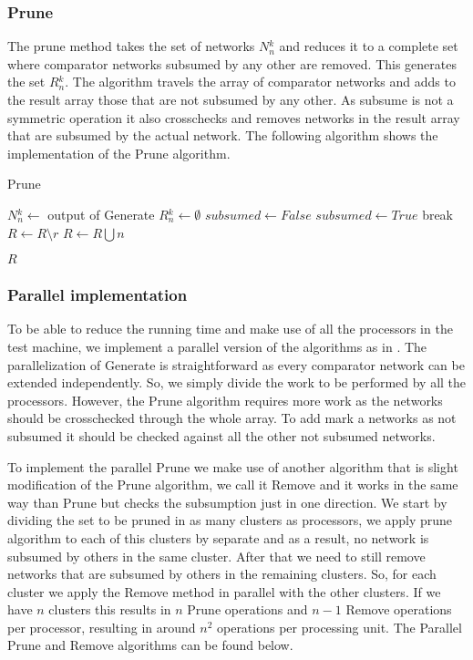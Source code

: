\documentclass[../main.tex]{subfiles}
\begin{document}
	\subsubsection{Prune}
	The prune method takes the set of networks $N{_n^{k}}$ and reduces it to a complete set where comparator networks subsumed by any other are removed. This generates the set $R{_n^k}$. The algorithm travels the array of comparator networks and adds to the result array those that are not subsumed by any other. As subsume is not a symmetric operation it also crosschecks and removes networks in the result array that are subsumed by the actual network. The following algorithm shows the implementation of the Prune algorithm. 
	\begin{algorithm}[H]
		\caption{Prune} 
		\begin{algorithmic}
			\State $N{_n^k} \leftarrow$ output of Generate
			\State $R{_n^k} \leftarrow \emptyset$
			\State $subsumed \leftarrow False$
			\State $subsumed \leftarrow True$
			\State break
			\EndIf
			\State $R \leftarrow R \setminus r$
			\EndIf
			\EndFor
			\State $R \leftarrow R \bigcup n$
			\EndIf
			\EndFor
			
			\Return $R$
		\end{algorithmic}
	\end{algorithm}
	
	\subsubsection{Parallel implementation}
	To be able to reduce the running time and make use of all the processors in the test machine, we implement a parallel version of the algorithms as in \cite{sortingnineinputs}. The parallelization of Generate is straightforward as every comparator network can be extended independently. So, we simply divide the work to be performed by all the processors.
	However, the Prune algorithm requires more work as the networks should be crosschecked through the whole array. To add mark a networks as not subsumed it should be checked against all the other not subsumed networks.
	
	To implement the parallel Prune we make use of another algorithm that is slight modification of the Prune algorithm, we call it Remove and it works in the same way than Prune but checks the subsumption just in one direction. We start by dividing the set to be pruned in as many clusters as processors, we apply prune algorithm to each of this clusters by separate and as a result, no network is subsumed by others in the same cluster. After that we need to still remove networks that are subsumed by others in the remaining clusters. So, for each cluster we apply the Remove method in parallel with the other clusters. If we have $n$ clusters this results in $n$ Prune operations and $n - 1$ Remove operations per processor, resulting in around $n^2$ operations per processing unit. The Parallel Prune and Remove algorithms can be found below.
	
\end{document}
